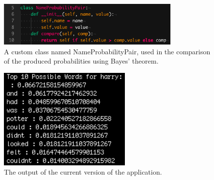 \documentclass[journal]{./IEEE/IEEEtran}
\begin{document}
\begin{figure}[!ht]
\begin{center}

\includegraphics[width=90mm]{images/npp_initial.png}
\caption{A custom class named NameProbabilityPair, used in the comparison of the produced probabilities using Bayes' theorem.}

\end{center}
\end{figure}

\begin{figure}[!ht]
\begin{center}

\includegraphics[height=50mm]{images/initial_output.png}
\caption{The output of the current version of the application.}

\end{center}
\end{figure}




\end{document}
